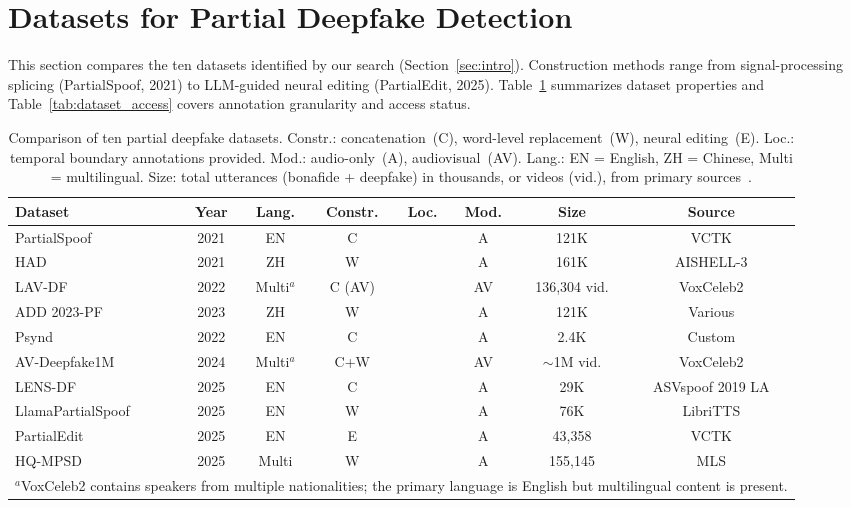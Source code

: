 \documentclass[journal]{IEEEtran}
\newcommand{\cmark}{\ding{51}}
\begin{document}
\section{Datasets for Partial Deepfake Detection}
\label{sec:datasets}

This section compares the ten datasets identified by our search (Section~\ref{sec:intro}). Construction methods range from signal-processing splicing (PartialSpoof, 2021) to LLM-guided neural editing (PartialEdit, 2025). Table~\ref{tab:datasets} summarizes dataset properties and Table~\ref{tab:dataset_access} covers annotation granularity and access status.

\begin{table}[t]
\centering
\caption{Comparison of ten partial deepfake datasets. Constr.: concatenation~(C), word-level replacement~(W), neural editing~(E). Loc.: temporal boundary annotations provided. Mod.: audio-only~(A), audiovisual~(AV). Lang.: EN = English, ZH = Chinese, Multi = multilingual. Size: total utterances (bonafide + deepfake) in thousands, or videos (vid.), from primary sources~\cite{zhang2023partialspoof,yi2021had,cai2023lavdf_cviu,yi2023add,zhang2022localizing,cai2024avdeepfake1m,liu2025lensdf,luong2025llamapartialspoof,zhang2025partialedit,li2025hqmpsd}.}
\label{tab:datasets}
\small
\begin{tabular}{lccccccc}
\toprule
\textbf{Dataset} & \textbf{Year} & \textbf{Lang.} & \textbf{Constr.} & \textbf{Loc.} & \textbf{Mod.} & \textbf{Size} & \textbf{Source} \\
\midrule
PartialSpoof~\cite{zhang2023partialspoof} & 2021 & EN & C & \cmark & A & 121K & VCTK \\
HAD~\cite{yi2021had} & 2021 & ZH & W & \cmark & A & 161K & AISHELL-3 \\
LAV-DF~\cite{cai2022lavdf} & 2022 & Multi$^a$ & C (AV) & \cmark & AV & 136,304 vid. & VoxCeleb2 \\
ADD 2023-PF~\cite{yi2023add} & 2023 & ZH & W & \cmark & A & 121K & Various \\
Psynd~\cite{zhang2022localizing} & 2022 & EN & C & \cmark & A & 2.4K & Custom \\
AV-Deepfake1M~\cite{cai2024avdeepfake1m} & 2024 & Multi$^a$ & C+W & \cmark & AV & ${\sim}$1M vid. & VoxCeleb2 \\
LENS-DF~\cite{liu2025lensdf} & 2025 & EN & C & \cmark & A & 29K & ASVspoof 2019 LA \\
LlamaPartialSpoof~\cite{luong2025llamapartialspoof} & 2025 & EN & W & \cmark & A & 76K & LibriTTS \\
PartialEdit~\cite{zhang2025partialedit} & 2025 & EN & E & \cmark & A & 43,358 & VCTK \\
HQ-MPSD~\cite{li2025hqmpsd} & 2025 & Multi & W & \cmark & A & 155,145 & MLS \\
\bottomrule
\multicolumn{8}{l}{\footnotesize $^a$VoxCeleb2 contains speakers from multiple nationalities; the primary language is English but multilingual content is present.}
\end{tabular}
\end{table}
\end{document}
